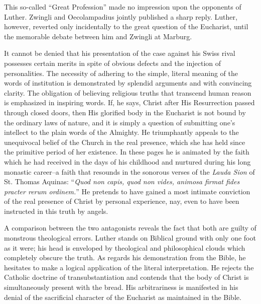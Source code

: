 This so-called “Great Profession” made no impression upon the
opponents of Luther. Zwingli and Oecolampadius jointly published
a sharp reply. Luther, however, reverted only incidentally to the
great question of the Eucharist, until the memorable debate between
him and Zwingli at Marburg.

It cannot be denied that his presentation of the case against his
Swiss rival possesses certain merits in spite of obvious defects and the
injection of personalities. The necessity of adhering to the simple,
literal meaning of the words of institution is demonstrated by splendid
arguments and with convincing clarity. The obligation of believing
religious truths that transcend human reason is emphasized
in inspiring words. If, he says, Christ after His Resurrection passed
through closed doors, then His glorified body in the Eucharist is
not bound by the ordinary laws of nature, and it is simply a question
of submitting one’s intellect to the plain words of the Almighty.
He triumphantly appeals to the unequivocal belief of the Church
in the real presence, which she has held since the primitive period of
her existence. In these pages he is animated by the faith which he had
received in the days of his childhood and nurtured during his long
monastic career--a faith that resounds in the sonorous verses of the
\textit{Lauda Sion} of St. Thomas Aquinas: “\textit{Quod non capis, quod non vides,
animosa firmat fides practer rerum ordinem.}” He pretends to have
gained a most intimate conviction of the real presence of Christ by
personal experience, nay, even to have been instructed in this truth
by angels.

A comparison between the two antagonists reveals the fact that
both are guilty of monstrous theological errors. Luther stands on
Biblical ground with only one foot as it were; his head is enveloped
by theological and philosophical clouds which completely obscure the
truth. As regards his demonstration from the Bible, he hesitates to
make a logical application of the literal interpretation. He rejects the
Catholic doctrine of transubstantiation and contends that the body of
Christ is simultaneously present with the bread. His arbitrariness is
manifested in his denial of the sacrificial character of the Eucharist as
maintained in the Bible.

